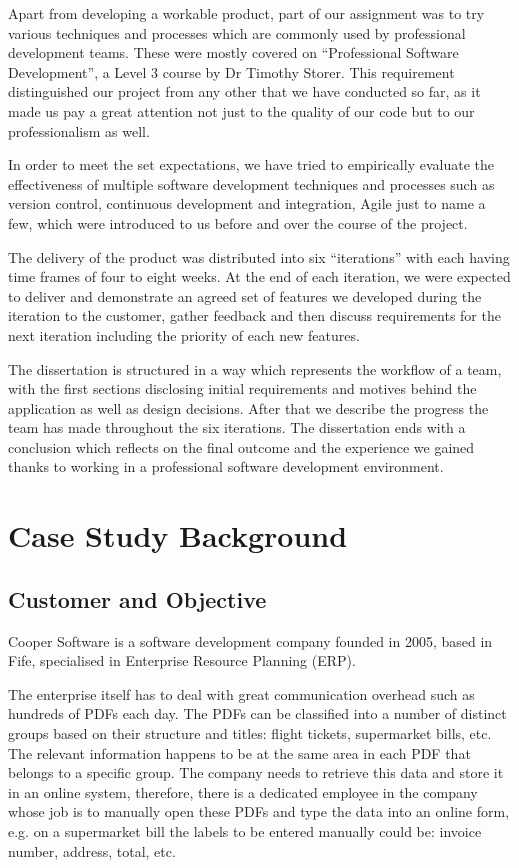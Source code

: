 \documentclass{l3proj}
\begin{document}
Apart from developing a workable product, part of our assignment was to try various techniques and processes which are commonly used by professional development teams. These were mostly covered on ``Professional Software Development'', a Level 3 course by Dr Timothy Storer. This requirement distinguished our project from any other that we have conducted so far, as it made us pay a great attention not just to the quality of our code but to our professionalism as well.

In order to meet the set expectations, we have tried to empirically evaluate the effectiveness of multiple software development techniques and processes such as version control, continuous development and integration, Agile  just to name a few, which were introduced to us before and over the course of the project. 

The delivery of the product was distributed into six ``iterations'' with each having time frames of four to eight weeks. At the end of each iteration, we were expected to deliver and demonstrate an agreed set of features we developed during the iteration to the customer, gather feedback and then discuss requirements for the next iteration including the priority of each new features.

The dissertation is structured in a way which represents the workflow of a team, with the first sections disclosing initial requirements and motives behind the application as well as design decisions. After that we describe the progress the team has made throughout the six iterations. The dissertation ends with a conclusion which reflects on the final outcome and the experience we gained thanks to working in a professional software development environment.
\section{Case Study Background}
\subsection{Customer and Objective}

Cooper Software is a software development company founded in 2005, based in Fife, specialised in Enterprise Resource Planning (ERP).

The enterprise itself has to deal with great communication overhead such as hundreds of PDFs each day. The PDFs can be classified into a number of distinct groups based on their structure and titles: flight tickets, supermarket bills, etc. The relevant information happens to be at the same area in each PDF that belongs to a specific group. The company needs to retrieve this data and store it in an online system, therefore, there is a dedicated employee in the company whose job is to manually open these PDFs and type the data into an online form, e.g. on a supermarket bill the labels to be entered manually could be: invoice number, address, total, etc.
\end{document}
